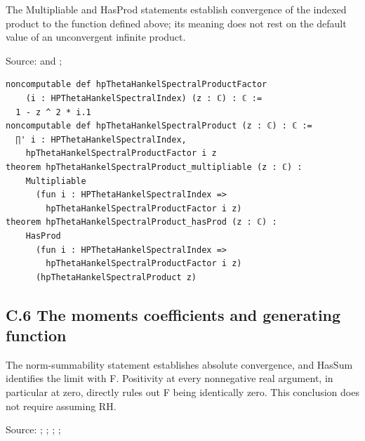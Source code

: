 \documentclass[
  11pt,
]{article}
\begin{document}
The Multipliable and HasProd statements establish convergence of the indexed product to the function defined above; its meaning does not rest on the default value of an unconvergent infinite product.

Source:  and ; 

\begin{verbatim}
noncomputable def hpThetaHankelSpectralProductFactor
    (i : HPThetaHankelSpectralIndex) (z : ℂ) : ℂ :=
  1 - z ^ 2 * i.1
noncomputable def hpThetaHankelSpectralProduct (z : ℂ) : ℂ :=
  ∏' i : HPThetaHankelSpectralIndex,
    hpThetaHankelSpectralProductFactor i z
theorem hpThetaHankelSpectralProduct_multipliable (z : ℂ) :
    Multipliable
      (fun i : HPThetaHankelSpectralIndex =>
        hpThetaHankelSpectralProductFactor i z)
theorem hpThetaHankelSpectralProduct_hasProd (z : ℂ) :
    HasProd
      (fun i : HPThetaHankelSpectralIndex =>
        hpThetaHankelSpectralProductFactor i z)
      (hpThetaHankelSpectralProduct z)
\end{verbatim}

\hypertarget{c.6-the-moments-coefficients-and-generating-function}{%
\subsection{C.6 The moments coefficients and generating function}\label{c.6-the-moments-coefficients-and-generating-function}}

The norm-summability statement establishes absolute convergence, and HasSum identifies the limit with F. Positivity at every nonnegative real argument, in particular at zero, directly rules out F being identically zero. This conclusion does not require assuming RH.

Source: ; ; ; ; 
\end{document}
